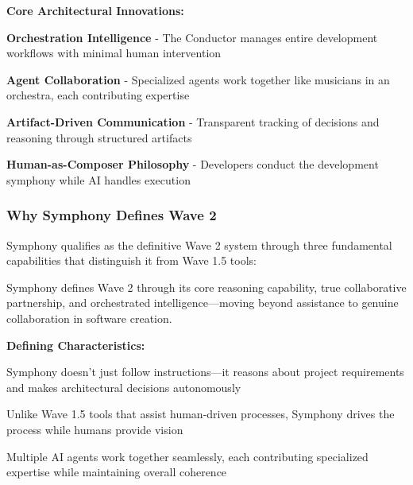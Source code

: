 \textbf{Core Architectural Innovations:}

\begin{expandedlist}
    \item \textbf{Orchestration Intelligence} - The Conductor manages entire development workflows with minimal human intervention
    
    \item \textbf{Agent Collaboration} - Specialized agents work together like musicians in an orchestra, each contributing expertise
    
    \item \textbf{Artifact-Driven Communication} - Transparent tracking of decisions and reasoning through structured artifacts
    
    \item \textbf{Human-as-Composer Philosophy} - Developers conduct the development symphony while AI handles execution
\end{expandedlist}

\subsubsection{Why Symphony Defines Wave 2}

Symphony qualifies as the definitive Wave 2 system through three fundamental capabilities that distinguish it from Wave 1.5 tools:

\begin{alertbox}
Symphony defines Wave 2 through its core reasoning capability, true collaborative partnership, and orchestrated intelligence—moving beyond assistance to genuine collaboration in software creation.
\end{alertbox}

\textbf{Defining Characteristics:}

\begin{description}[leftmargin=4cm,labelwidth=3.5cm]
    \item[\textbf{Core Reasoning}] Symphony doesn't just follow instructions—it reasons about project requirements and makes architectural decisions autonomously
    
    \item[\textbf{True Collaboration}] Unlike Wave 1.5 tools that assist human-driven processes, Symphony drives the process while humans provide vision
    
    \item[\textbf{Orchestrated Intelligence}] Multiple AI agents work together seamlessly, each contributing specialized expertise while maintaining overall coherence
\end{description}

